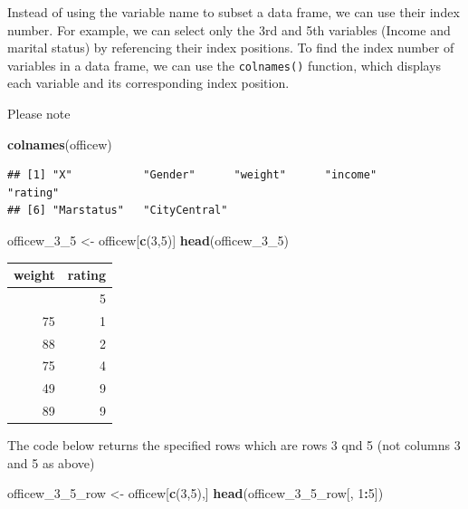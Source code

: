 \documentclass[
]{article}
\newenvironment{Shaded}{\begin{snugshade}}{\end{snugshade}}
\newcommand{\DecValTok}[1]{\textcolor[rgb]{0.00,0.00,0.81}{#1}}
\newcommand{\FunctionTok}[1]{\textcolor[rgb]{0.13,0.29,0.53}{\textbf{#1}}}
\newcommand{\NormalTok}[1]{#1}
\newcommand{\OtherTok}[1]{\textcolor[rgb]{0.56,0.35,0.01}{#1}}
\newcommand{\SpecialCharTok}[1]{\textcolor[rgb]{0.81,0.36,0.00}{\textbf{#1}}}
\begin{document}
Instead of using the variable name to subset a data frame, we can use
their index number. For example, we can select only the 3rd and 5th
variables (Income and marital status) by referencing their index
positions. To find the index number of variables in a data frame, we can
use the \texttt{colnames()} function, which displays each variable and
its corresponding index position.

Please note

\begin{Shaded}
\begin{Highlighting}[]
\FunctionTok{colnames}\NormalTok{(officew)}
\end{Highlighting}
\end{Shaded}

\begin{verbatim}
## [1] "X"           "Gender"      "weight"      "income"      "rating"     
## [6] "Marstatus"   "CityCentral"
\end{verbatim}

\begin{Shaded}
\begin{Highlighting}[]
\NormalTok{officew\_3\_5 }\OtherTok{\textless{}{-}}\NormalTok{ officew[}\FunctionTok{c}\NormalTok{(}\DecValTok{3}\NormalTok{,}\DecValTok{5}\NormalTok{)]}
\FunctionTok{head}\NormalTok{(officew\_3\_5)}
\end{Highlighting}
\end{Shaded}

\begin{longtable}[]{@{}rr@{}}
\toprule\noalign{}
weight & rating \\
\midrule\noalign{}
\endhead
\bottomrule\noalign{}
\endlastfoot
89 & 5 \\
75 & 1 \\
88 & 2 \\
75 & 4 \\
49 & 9 \\
89 & 9 \\
\end{longtable}

The code below returns the specified rows which are rows 3 qnd 5 (not
columns 3 and 5 as above)

\begin{Shaded}
\begin{Highlighting}[]
\NormalTok{officew\_3\_5\_row }\OtherTok{\textless{}{-}}\NormalTok{ officew[}\FunctionTok{c}\NormalTok{(}\DecValTok{3}\NormalTok{,}\DecValTok{5}\NormalTok{),]}
\FunctionTok{head}\NormalTok{(officew\_3\_5\_row[, }\DecValTok{1}\SpecialCharTok{:}\DecValTok{5}\NormalTok{])}
\end{Highlighting}
\end{Shaded}
\end{document}
